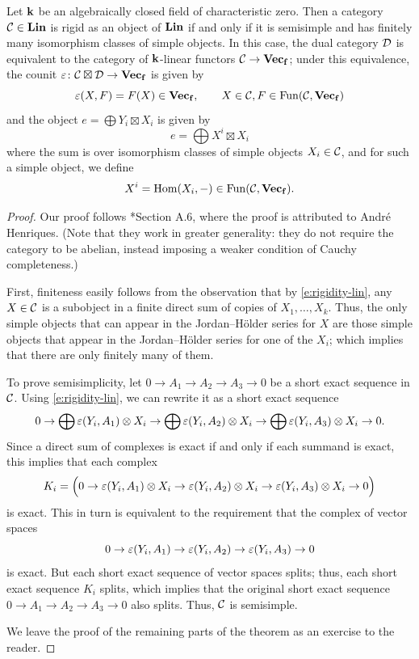 \begin{theorem}\label{t:dualizable-linear}
  Let $\mathbf{k}$ be an algebraically closed field of characteristic zero. Then a
  category $\mathcal{C}\in \mathbf{Lin}$ is rigid as an object of $\mathbf{Lin}$ if and only if it
  is semisimple and has finitely many isomorphism classes of simple objects. In
  this case, the dual category $\mathcal{D}$ is equivalent to the category of
  $\mathbf{k}$-linear functors $\mathcal{C}\to \mathbf{Vec_f}$; under this equivalence, the counit
  $\varepsilon\colon \mathcal{C}\boxtimes\mathcal{D}\to \mathbf{Vec_f}$ is given by
  $$
    \varepsilon(X,F) = F(X)\in \mathbf{Vec_f},\qquad X\in \mathcal{C}, F\in \operatorname{Fun}(\mathcal{C}, \mathbf{Vec_f})
  $$
  and the object $e=\bigoplus Y_i\boxtimes X_i$ is given by
  $$
    e=\bigoplus X^i \boxtimes X_i
  $$
  where the sum is over isomorphism classes of simple objects $X_i\in \mathcal{C}$,
  and for such a simple object, we define
  $$
    X^i=\operatorname{Hom}(X_i, -)\in \operatorname{Fun}(\mathcal{C}, \mathbf{Vec_f}).
  $$
\end{theorem}
\begin{proof}
  Our proof follows *{Section A.6}, where the proof is attributed
  to Andr\'e Henriques. (Note that they work in greater generality: they do not
  require the category to be abelian, instead imposing a weaker condition of
  Cauchy completeness.)


  First, finiteness easily follows from the observation that by
  \eqref{e:rigidity-lin}, any $X\in \mathcal{C}$ is a subobject in a finite direct sum
  of copies of $X_1, \dots, X_k$. Thus, the only simple objects that can appear
  in the Jordan--H\"older series for $X$ are those simple objects that appear in
  the Jordan--H\"older series for one of the $X_i$; which implies that there are only
  finitely many of them.

  To prove semisimplicity, let $0\to A_1\to A_2\to A_3\to 0$ be a short exact
  sequence in $\mathcal{C}$. Using \eqref{e:rigidity-lin}, we can rewrite it as a
  short exact sequence
  $$
  0 \to \bigoplus \varepsilon(Y_i, A_1)\otimes X_i
    \to \bigoplus \varepsilon(Y_i, A_2)\otimes X_i
    \to \bigoplus \varepsilon(Y_i, A_3)\otimes X_i
  \to 0.
  $$
  Since a direct sum of complexes is exact if and only if each summand is
  exact, this implies that each complex
  $$
  K_i = \Bigl(
      0 \to  \varepsilon(Y_i, A_1)\otimes X_i
          \to  \varepsilon(Y_i, A_2)\otimes X_i
          \to \varepsilon(Y_i, A_3)\otimes X_i
        \to 0
        \Bigr)
  $$
  is exact. This in turn is equivalent to the requirement that the complex of
  vector spaces
  $$
    0 \to  \varepsilon(Y_i, A_1)
            \to  \varepsilon(Y_i, A_2)
            \to \varepsilon(Y_i, A_3)
    \to 0
  $$
  is exact. But each short exact sequence of vector spaces splits; thus, each
  short exact sequence $K_i$ splits, which implies that the original short
  exact sequence $0\to A_1\to A_2\to A_3\to 0$ also splits. Thus, $\mathcal{C}$ is
  semisimple.

  We leave the proof of the remaining parts of the theorem as an exercise to the
  reader.
 \end{proof}

